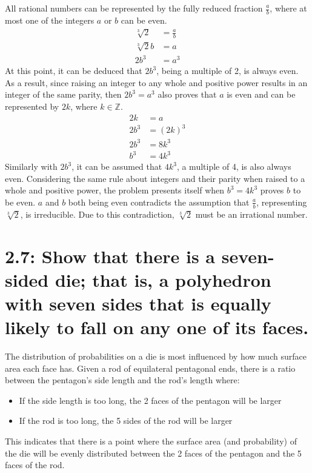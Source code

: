 \documentclass{article}
\begin{document}
All rational numbers can be represented by the fully reduced fraction $\frac{a}{b}$, where at most one of the integers $a$ or $b$ can be even.
\begin{align*}
  \sqrt[3]{2}&=\frac{a}{b}\\
  \sqrt[3]{2}b&=a\\
  2b^3&=a^3
\end{align*}
At this point, it can be deduced that $2b^3$, being a multiple of 2, is always even. As a result, since raising an integer to any whole and positive power results in an integer of the same parity, then $2b^3=a^3$ also proves that $a$ is even and can be represented by $2k$, where $k\in\mathbb{Z}$.
\begin{align*}
  2k&=a\\
  2b^3&=(2k)^3\\
  2b^3&=8k^3\\
  b^3&=4k^3
\end{align*}
Similarly with $2b^3$, it can be assumed that $4k^3$, a multiple of 4, is also always even. Considering the same rule about integers and their parity when raised to a whole and positive power, the problem presents itself when $b^3=4k^3$ proves $b$ to be even. $a$ and $b$ both being even contradicts the assumption that $\frac{a}{b}$, representing $\sqrt[3]{2}$, is irreducible. Due to this contradiction, $\sqrt[3]{2}$ must be an irrational number.

\section*{2.7: Show that there is a seven-sided die; that is, a polyhedron with seven sides that is equally likely to fall on any one of its faces.}

The distribution of probabilities on a die is most influenced by how much surface area each face has. Given a rod of equilateral pentagonal ends, there is a ratio between the pentagon's side length and the rod's length where:
\begin{itemize}
  \item If the side length is too long, the 2 faces of the pentagon will be larger
  \item If the rod is too long, the 5 sides of the rod will be larger
\end{itemize}
This indicates that there is a point where the surface area (and probability) of the die will be evenly distributed between the 2 faces of the pentagon and the 5 faces of the rod.
\end{document}
